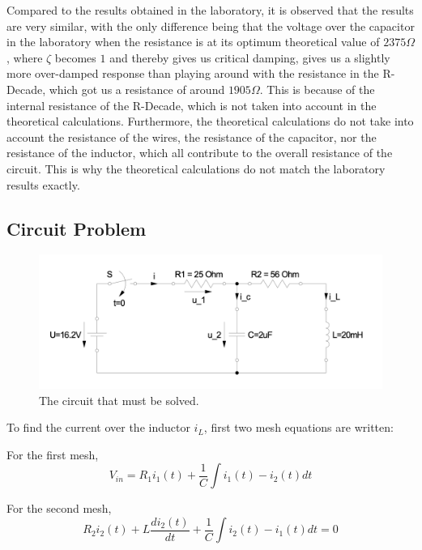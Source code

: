 Compared to the results obtained in the laboratory, it is observed that the results are very similar, with the only difference being that the voltage over the capacitor in the laboratory when the resistance is at its optimum theoretical value of
$2375\Omega$, where $\zeta$ becomes $1$ and thereby gives us critical damping, gives us a slightly more over-damped response than playing around with the resistance in the R-Decade, which got us a resistance of around $1905\Omega$. This is because of the internal resistance of the R-Decade, which is not taken into account in the theoretical calculations. Furthermore, the theoretical calculations do not take into account the resistance of the wires, the resistance of the capacitor, nor the resistance of the inductor, which all contribute to the overall resistance of the circuit. This is why the theoretical calculations do not match the laboratory results exactly.

\subsection{Circuit Problem}

\begin{figure}[H]
    \centering
    \includegraphics[width=\linewidth]{images/evaluation_circuit.png}
    \caption{The circuit that must be solved.}
    \label{fig:evaluation_circuit}
\end{figure}

To find the current over the inductor $i_L$, first two mesh equations are written:

For the first mesh,
\begin{equation}
    V_{in} = R_1i_1(t) + \frac{1}{C}\int{i_1(t)-i_2(t) dt}
\end{equation}

For the second mesh,
\begin{equation}
    R_2i_2(t)+L\frac{di_2(t)}{dt} + \frac{1}{C}\int{i_2(t)-i_1(t) dt} = 0
\end{equation}

